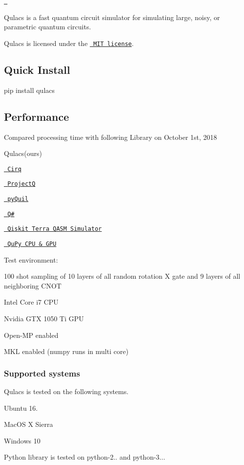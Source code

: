 \href{https://travis-ci.org/qulacs/qulacs}{\texttt{ }}

Qulacs is a fast quantum circuit simulator for simulating large, noisy, or parametric quantum circuits.

Qulacs is licensed under the \href{https://github.com/qulacs/qulacs/blob/master/LICENSE}{\texttt{ M\+IT license}}.

\subsection*{Quick Install}

{\ttfamily pip install qulacs}

\subsection*{Performance}


\begin{DoxyItemize}
\item Compared processing time with following Library on October 1st, 2018
\begin{DoxyItemize}
\item Qulacs(ours)
\item \href{https://github.com/quantumlib/Cirq}{\texttt{ Cirq}}
\item \href{https://github.com/ProjectQ-Framework/ProjectQ}{\texttt{ ProjectQ}}
\item \href{https://github.com/rigetticomputing/pyquil}{\texttt{ py\+Quil}}
\item \href{https://github.com/Microsoft/Quantum}{\texttt{ Q\#}}
\item \href{https://github.com/Qiskit/qiskit-terra/tree/master/src/qasm-simulator-cpp}{\texttt{ Qiskit Terra Q\+A\+SM Simulator}}
\item \href{https://github.com/ken-nakanishi/qupy}{\texttt{ Qu\+Py C\+PU \& G\+PU}}
\end{DoxyItemize}
\item Test environment\+:
\begin{DoxyItemize}
\item 100 shot sampling of 10 layers of all random rotation X gate and 9 layers of all neighboring C\+N\+OT
\item Intel Core i7 C\+PU
\item Nvidia G\+TX 1050 Ti G\+PU
\item Open-\/\+MP enabled
\item M\+KL enabled (numpy runs in multi core)
\end{DoxyItemize}
\end{DoxyItemize}



\subsubsection*{Supported systems}

Qulacs is tested on the following systems.


\begin{DoxyItemize}
\item Ubuntu 16.
\item Mac\+OS X Sierra
\item Windows 10
\end{DoxyItemize}

Python library is tested on python-\/2.. and python-\/3... 